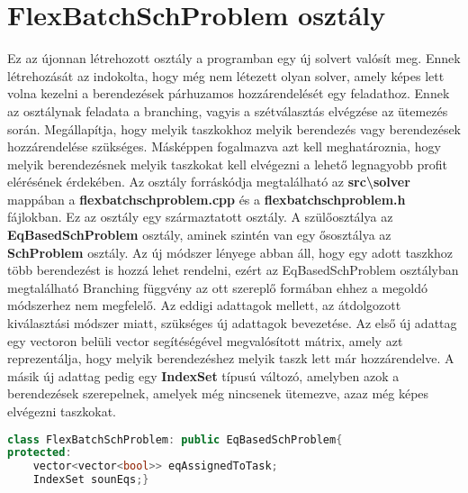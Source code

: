 \section{FlexBatchSchProblem osztály}
Ez az újonnan létrehozott osztály a programban egy új solvert valósít meg.
Ennek létrehozását az indokolta, hogy még nem létezett olyan solver, amely képes lett volna kezelni a berendezések párhuzamos hozzárendelését egy feladathoz.
Ennek az osztálynak feladata a branching, vagyis a szétválasztás elvégzése az ütemezés során.
Megállapítja, hogy melyik taszkokhoz melyik berendezés vagy berendezések hozzárendelése szükséges.
Másképpen fogalmazva azt kell meghatároznia, hogy melyik berendezésnek melyik taszkokat kell elvégezni a lehető legnagyobb profit elérésének érdekében.
Az osztály forráskódja megtalálható az \textbf{src\textbackslash solver} mappában a \textbf{flexbatchschproblem.cpp} és a \textbf{flexbatchschproblem.h} fájlokban.
Ez az osztály egy származtatott osztály.
A szülőosztálya az \textbf{EqBasedSchProblem} osztály, aminek szintén van egy ősosztálya az \textbf{SchProblem} osztály.
Az új módszer lényege abban áll, hogy egy adott taszkhoz több berendezést is hozzá lehet rendelni, ezért az EqBasedSchProblem osztályban megtalálható Branching függvény az ott szereplő formában ehhez a megoldó módszerhez nem megfelelő.
Az eddigi adattagok mellett, az átdolgozott kiválasztási módszer miatt, szükséges új adattagok bevezetése.
Az első új adattag egy vectoron belüli vector segítéségével megvalósított mátrix, amely azt reprezentálja, hogy melyik berendezéshez melyik taszk lett már hozzárendelve.
A másik új adattag pedig egy \textbf{IndexSet} típusú változó, amelyben azok a berendezések szerepelnek, amelyek még nincsenek ütemezve, azaz még képes elvégezni taszkokat.
\begin{lstlisting}[caption={FlexBatchSchProblem osztály adattagjai},language=c++,numbers=none]
class FlexBatchSchProblem: public EqBasedSchProblem{
protected:
	vector<vector<bool>> eqAssignedToTask;
    IndexSet sounEqs;}
\end{lstlisting}

